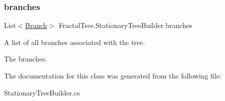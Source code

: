 \subsubsection{\texorpdfstring{branches}{branches}}
{\footnotesize\ttfamily List$<$\hyperlink{interface_fractal_tree_1_1_branch}{Branch}$>$ Fractal\+Tree.\+Stationary\+Tree\+Builder.\+branches\hspace{0.3cm}{\ttfamily [get]}}



A list of all branches associated with the tree. 

The branches.

The documentation for this class was generated from the following file\+:\begin{DoxyCompactItemize}
\item 
Stationary\+Tree\+Builder.\+cs\end{DoxyCompactItemize}
